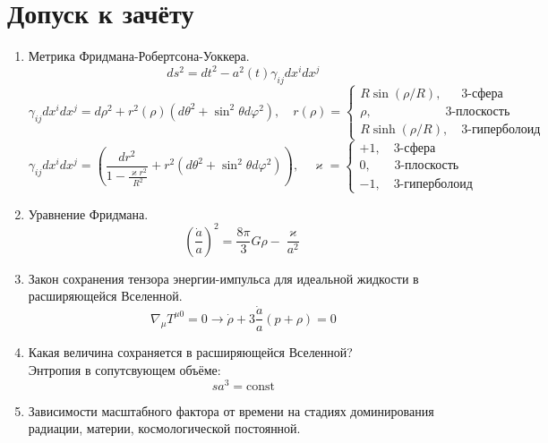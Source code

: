 \documentclass[12pt]{article}
\theoremstyle{definition}
\begin{document}
\section{Допуск к зачёту}
\begin{enumerate}
    \item Метрика Фридмана-Робертсона-Уоккера.
    \begin{equation}
        ds^2=dt^2-a^2(t)\gamma_{ij}dx^idx^j
    \end{equation}
    \begin{equation}
        \gamma_{ij}dx^idx^j=d\rho^2+r^2(\rho)(d\theta^2+\sin^2\theta d\varphi^2),\quad r(\rho)=\begin{cases}
            R\sin(\rho/R),\quad\;\;\text{3-сфера}\\
            \rho,\quad\quad\quad\quad\quad\;\;\;\text{3-плоскость}\\
            R\sinh(\rho/R),\quad\text{3-гиперболоид}
        \end{cases}
    \end{equation}
    \begin{equation}
        \gamma_{ij}dx^idx^j=\left(\frac{dr^2}{1-\frac{\varkappa r^2}{R^2}}+r^2(d\theta^2+\sin^2\theta d\varphi^2)\right),\quad \varkappa=\begin{cases}
            +1,\quad\text{3-сфера}\\
            0,\quad\;\;\;\text{3-плоскость}\\
            -1,\quad\text{3-гиперболоид}
        \end{cases}
    \end{equation}
    \item Уравнение Фридмана.
    \begin{equation}
        \left(\frac{\dot{a}}{a}\right)^2=\frac{8\pi}{3}G\rho-\frac{\varkappa}{a^2}
    \end{equation}
    \item Закон сохранения тензора энергии-импульса для идеальной жидкости в расширяющейся Вселенной.
    \begin{equation}
        \nabla_\mu T^{\mu0}=0\rightarrow\dot{\rho}+3\frac{\dot{a}}{a}(p+\rho)=0
    \end{equation}
    \item Какая величина сохраняется в расширяющейся Вселенной?\\
    Энтропия в сопутсвующем объёме:
    \begin{equation}
        sa^3=\text{const}
    \end{equation}
    \item Зависимости масштабного фактора от времени на стадиях доминирования радиации, материи, космологической постоянной.
    

\end{enumerate}
\end{document}
